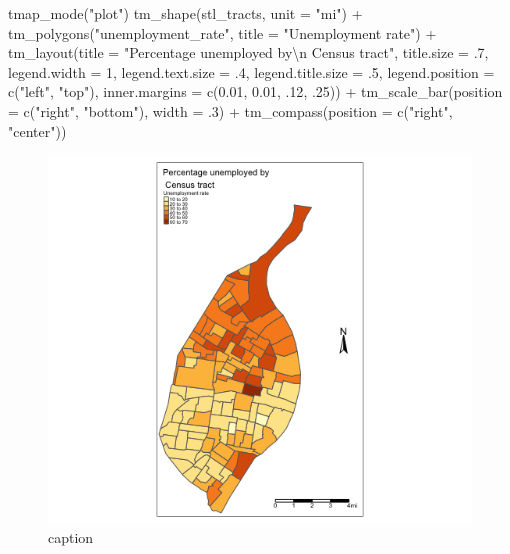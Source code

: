 \documentclass[
  krantz2]{krantz}
\makeatletter
\newenvironment{Shaded}{\begin{snugshade}}{\end{snugshade}}
\newcommand{\AttributeTok}[1]{\textcolor[rgb]{0.61,0.61,0.61}{#1}}
\newcommand{\DecValTok}[1]{\textcolor[rgb]{0.06,0.06,0.06}{#1}}
\newcommand{\FloatTok}[1]{\textcolor[rgb]{0.06,0.06,0.06}{#1}}
\newcommand{\FunctionTok}[1]{\textcolor[rgb]{0,0,0}{#1}}
\newcommand{\NormalTok}[1]{#1}
\newcommand{\SpecialCharTok}[1]{\textcolor[rgb]{0,0,0}{#1}}
\newcommand{\StringTok}[1]{\textcolor[rgb]{0.5,0.5,0.5}{#1}}
\newenvironment{kframe}{%
\medskip{}
\setlength{\fboxsep}{.8em}
 \def\at@end@of@kframe{}%
 \ifinner\ifhmode%
  \def\at@end@of@kframe{\end{minipage}}%
  \begin{minipage}{\columnwidth}%
 \fi\fi%
 \def\FrameCommand##1{\hskip\@totalleftmargin \hskip-\fboxsep
 \colorbox{shadecolor}{##1}\hskip-\fboxsep
     \hskip-\linewidth \hskip-\@totalleftmargin \hskip\columnwidth}%
 \MakeFramed {\advance\hsize-\width
   \@totalleftmargin\z@ \linewidth\hsize
   \@setminipage}}%
 {\par\unskip\endMakeFramed%
 \at@end@of@kframe}
\renewenvironment{Shaded}{\begin{kframe}}{\end{kframe}}
\makeatother
\begin{document}
\begin{Shaded}
\begin{Highlighting}[]
\FunctionTok{tmap\_mode}\NormalTok{(}\StringTok{"plot"}\NormalTok{)}
\FunctionTok{tm\_shape}\NormalTok{(stl\_tracts, }\AttributeTok{unit =} \StringTok{"mi"}\NormalTok{) }\SpecialCharTok{+}
  \FunctionTok{tm\_polygons}\NormalTok{(}\StringTok{"unemployment\_rate"}\NormalTok{, }\AttributeTok{title =} \StringTok{"Unemployment rate"}\NormalTok{)  }\SpecialCharTok{+}
   \FunctionTok{tm\_layout}\NormalTok{(}\AttributeTok{title =} \StringTok{"Percentage unemployed by}\SpecialCharTok{\textbackslash{}n}\StringTok{ Census tract"}\NormalTok{, }\AttributeTok{title.size =}\NormalTok{ .}\DecValTok{7}\NormalTok{, }\AttributeTok{legend.width =} \DecValTok{1}\NormalTok{, }\AttributeTok{legend.text.size =}\NormalTok{ .}\DecValTok{4}\NormalTok{, }\AttributeTok{legend.title.size =}\NormalTok{ .}\DecValTok{5}\NormalTok{, }\AttributeTok{legend.position =} \FunctionTok{c}\NormalTok{(}\StringTok{"left"}\NormalTok{, }\StringTok{"top"}\NormalTok{),}
             \AttributeTok{inner.margins =} \FunctionTok{c}\NormalTok{(}\FloatTok{0.01}\NormalTok{, }\FloatTok{0.01}\NormalTok{, .}\DecValTok{12}\NormalTok{, .}\DecValTok{25}\NormalTok{)) }\SpecialCharTok{+}
    \FunctionTok{tm\_scale\_bar}\NormalTok{(}\AttributeTok{position =} \FunctionTok{c}\NormalTok{(}\StringTok{"right"}\NormalTok{, }\StringTok{"bottom"}\NormalTok{), }\AttributeTok{width =}\NormalTok{ .}\DecValTok{3}\NormalTok{) }\SpecialCharTok{+}
    \FunctionTok{tm\_compass}\NormalTok{(}\AttributeTok{position =} \FunctionTok{c}\NormalTok{(}\StringTok{"right"}\NormalTok{, }\StringTok{"center"}\NormalTok{))}
\end{Highlighting}
\end{Shaded}

\begin{figure}
\centering
\includegraphics{tmap-images/code-6.png}
\caption{caption}
\end{figure}
\end{document}
